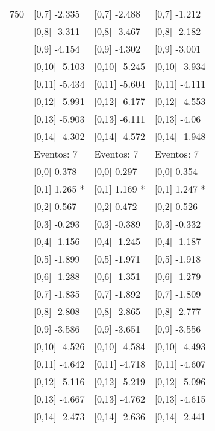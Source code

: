 \begin{table}
\begin{tabular}[t]{llll}
750 & {}[0,7] -2.335 & {}[0,7] -2.488 & {}[0,7] -1.212\\
\addlinespace
 & {}[0,8] -3.311 & {}[0,8] -3.467 & {}[0,8] -2.182\\
 & {}[0,9] -4.154 & {}[0,9] -4.302 & {}[0,9] -3.001\\
 & {}[0,10] -5.103 & {}[0,10] -5.245 & {}[0,10] -3.934\\
 & {}[0,11] -5.434 & {}[0,11] -5.604 & {}[0,11] -4.111\\
 & {}[0,12] -5.991 & {}[0,12] -6.177 & {}[0,12] -4.553\\
\addlinespace
 & {}[0,13] -5.903 & {}[0,13] -6.111 & {}[0,13] -4.06\\
 & {}[0,14] -4.302 & {}[0,14] -4.572 & {}[0,14] -1.948\\
 & Eventos:  7 & Eventos:  7 & Eventos:  7\\
 & {}[0,0] 0.378 & {}[0,0] 0.297 & {}[0,0] 0.354\\
 & {}[0,1] 1.265 * & {}[0,1] 1.169 * & {}[0,1] 1.247 *\\
\addlinespace
 & {}[0,2] 0.567 & {}[0,2] 0.472 & {}[0,2] 0.526\\
 & {}[0,3] -0.293 & {}[0,3] -0.389 & {}[0,3] -0.332\\
 & {}[0,4] -1.156 & {}[0,4] -1.245 & {}[0,4] -1.187\\
 & {}[0,5] -1.899 & {}[0,5] -1.971 & {}[0,5] -1.918\\
 & {}[0,6] -1.288 & {}[0,6] -1.351 & {}[0,6] -1.279\\
\addlinespace
1000 & {}[0,7] -1.835 & {}[0,7] -1.892 & {}[0,7] -1.809\\
 & {}[0,8] -2.808 & {}[0,8] -2.865 & {}[0,8] -2.777\\
 & {}[0,9] -3.586 & {}[0,9] -3.651 & {}[0,9] -3.556\\
 & {}[0,10] -4.526 & {}[0,10] -4.584 & {}[0,10] -4.493\\
 & {}[0,11] -4.642 & {}[0,11] -4.718 & {}[0,11] -4.607\\
\addlinespace
 & {}[0,12] -5.116 & {}[0,12] -5.219 & {}[0,12] -5.096\\
 & {}[0,13] -4.667 & {}[0,13] -4.762 & {}[0,13] -4.615\\
 & {}[0,14] -2.473 & {}[0,14] -2.636 & {}[0,14] -2.441\\
\bottomrule
\end{tabular}
\end{table}
